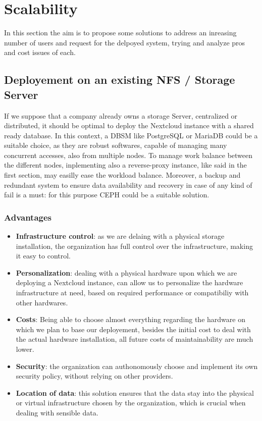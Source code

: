 \documentclass{article}
\begin{document}
	\section{Scalability}
	\label{sec:scalability}
	In this section the aim is to propose some solutions to address an inreasing number of users and request for the delpoyed system, trying and analyze pros and cost issues of each.
	
	\subsection{Deployement on an existing NFS / Storage Server}
	If we suppose that a company already owns a storage Server, centralized or distributed, it should be optimal to deploy the Nextcloud instance with a shared ready database. In this context, a DBSM like PostgreSQL or MariaDB could be a suitable choice, as they are robust softwares, capable of managing many concurrent accesses, also from multiple nodes. To manage work balance between the different nodes, inplementing also a reverse-proxy instance, like said in the first section, may easilly ease the workload balance. Moreover, a backup and redundant system to ensure data availability and recovery in case of any kind of fail is a must: for this purpose CEPH could be a suitable solution.
	
	\subsubsection{Advantages}
	\begin{itemize}
		\item \textbf{Infrastructure control}:  as we are delaing with a physical storage installation, the organization has full control over the infrastructure, making it easy to control.
		\item \textbf{Personalization}: dealing with a physical hardware upon which we are deploying a Nextcloud instance, can allow us to personalize the hardware infrastructure at need, based on required performance or compatibiliy with other hardwares.
		\item \textbf{Costs}: Being able to choose almost everything regarding the hardware on which we plan to base our deployement, besides the initial cost to deal with the actual hardware installation, all future costs of maintainability are much lower.
		\item \textbf{Security}: the organization can authonomously choose and implement its own security policy, without relying on other providers.
		\item \textbf{Location of data}: this solution ensures that the data stay into the physical or virtual infrastructure chosen by the organization, which is crucial when dealing with sensible data.
	\end{itemize}
	
\end{document}
